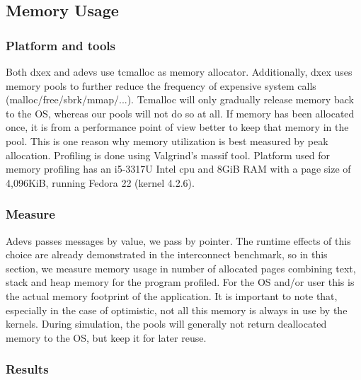 \subsection{Memory Usage}
\subsubsection{Platform and tools}
Both dxex and adevs use tcmalloc as memory allocator. Additionally, dxex uses memory pools to further reduce the frequency of expensive system calls (malloc/free/sbrk/mmap/...). Tcmalloc will only gradually release memory back to the OS, whereas our pools will not do so at all. If memory has been allocated once, it is from a performance point of view better to keep that memory in the pool. This is one reason why memory utilization is best measured by peak allocation. Profiling is done using Valgrind's massif tool. \cite{Nethercote:2007:VFH:1273442.1250746}
Platform used for memory profiling has an i5-3317U Intel cpu and 8GiB RAM with a page size of 4,096KiB, running Fedora 22 (kernel 4.2.6).\\
\subsubsection{Measure}
Adevs passes messages by value, we pass by pointer. The runtime effects of this choice are already demonstrated in the interconnect benchmark, so in this section, we measure memory usage in number of allocated pages combining text, stack and heap memory for the program profiled. For the OS and/or user this is the actual memory footprint of the application. It is important to note that, especially in the case of optimistic, not all this memory is always in use by the kernels. During simulation, the pools will generally not return deallocated memory to the OS, but keep it for later reuse.
\subsubsection{Results}
